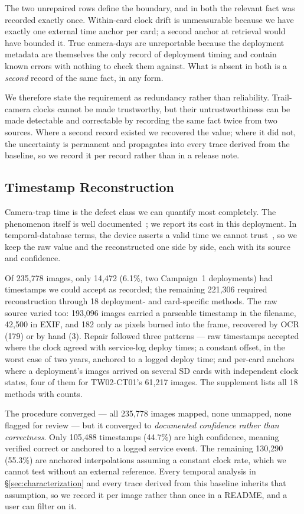 \documentclass[sigconf]{acmart}
\begin{document}
The two unrepaired rows define the boundary, and in both the relevant
fact was recorded exactly once. Within-card clock drift is unmeasurable because
we have exactly one external time anchor per card; a second anchor at
retrieval would have bounded it. True camera-days are unreportable
because the deployment metadata are themselves the only record of
deployment timing and contain known errors with nothing to check them
against. What is absent in both is a \emph{second} record of the same
fact, in any form.

We therefore state the requirement as redundancy rather than
reliability. Trail-camera clocks cannot be made trustworthy, but their
untrustworthiness can be made detectable and correctable by recording
the same fact twice from two sources. Where a second record existed we
recovered the value; where it did not, the uncertainty is permanent and
propagates into every trace derived from the baseline, so we record it
per record rather than in a release note.

\subsection{Timestamp Reconstruction}
\label{sec:timestamps}

Camera-trap time is the defect class we can quantify most completely.
The phenomenon itself is well
documented~\cite{lahozmonfort2021monitoring}; we report its cost in this
deployment. In temporal-database terms, the device asserts a valid time
we cannot trust~\cite{jensen1999temporal}, so we keep the raw value and
the reconstructed one side by side, each with its source and
confidence.

Of 235{,}778 images, only 14{,}472 (6.1\%, two Campaign~1 deployments)
had timestamps we could accept as recorded; the remaining
221{,}306 required reconstruction through 18 deployment- and
card-specific methods. The raw source varied too: 193{,}096 images
carried a parseable timestamp in the filename, 42{,}500 in EXIF, and
182 only as pixels burned into the frame, recovered by OCR (179) or by
hand (3). Repair followed three patterns --- raw timestamps accepted
where the clock agreed with service-log deploy times; a constant offset,
in the worst case of two years, anchored to a logged deploy time; and
per-card anchors where a deployment's images arrived on several SD cards
with independent clock states, four of them for TW02-CT01's
61{,}217 images. The supplement lists all 18 methods with counts.

The procedure converged --- all 235{,}778 images mapped, none unmapped,
none flagged for review --- but it converged to \emph{documented
confidence rather than correctness}. Only 105{,}488 timestamps (44.7\%)
are high confidence, meaning verified correct or anchored to a logged
service event. The remaining 130{,}290 (55.3\%) are anchored
interpolations assuming a constant clock rate, which we cannot test
without an external reference. Every temporal analysis in
\S\ref{sec:characterization} and every trace derived from this baseline
inherits that assumption, so we record it per image rather than once in
a README, and a user can filter on it.
\end{document}
